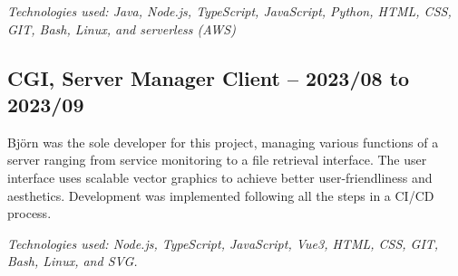 \documentclass{article}
\begin{document}
\begin{minipage}[t]{0.7\textwidth}
		\vspace{5pt}\textit{Technologies used: Java, Node.js, TypeScript, JavaScript, Python, HTML, CSS, GIT, Bash, Linux, and serverless (AWS)}
		
		\vspace{15pt} %
		\subsection*{\textcolor{colorTitelErfarenhet}{CGI, Server Manager Client – 2023/08 to 2023/09}}
		Björn was the sole developer for this project, managing various functions of a server ranging from service monitoring to a file retrieval interface. The user interface uses scalable vector graphics to achieve better user-friendliness and aesthetics. Development was implemented following all the steps in a CI/CD process.
		
		\vspace{5pt}\textit{Technologies used: Node.js, TypeScript, JavaScript, Vue3, HTML, CSS, GIT, Bash, Linux, and SVG.}
		
	\end{minipage}%
	\hfill
\end{document}
